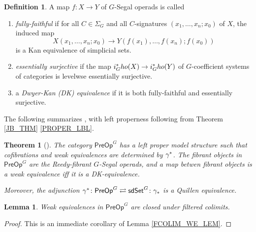 \documentclass[a4paper,10pt
,draft
]{article}%
\numberwithin{equation}{section}
\numberwithin{figure}{section}
\newtheorem{theorem}[equation]{Theorem}%
\newtheorem{lemma}[equation]{Lemma}%
\theoremstyle{definition} %
\newtheorem{definition}[equation]{Definition}%
\newcommand{\1}{\ensuremath{\mathbbm 1}}%
\begin{document}
\begin{definition}
      A map $f \colon X \to Y$ of $G$-Segal operads is called
      \begin{enumerate}[label = (\roman*)]
      \item \textit{fully-faithful} if for all $C \in \Sigma_G$ and all $C$-signatures $(x_1,\dots, x_n;x_0)$ of $X$, the induced map
            \[
                  X(x_1, \dots, x_n; x_0) \to Y(f(x_1), \dots, f(x_n); f(x_0))
            \]
            is a Kan equivalence of simplicial sets.
      \item \textit{essentially surjective} if the map 
      $i_G^{\**}ho(X) \to i_G^{\**}ho(Y)$ of $G$-coefficient systems of categories
            is levelwse essentially surjective.
      \item a \textit{Dwyer-Kan (DK) equivalence} if it is both fully-faithful and essentially surjective.
      \end{enumerate}
\end{definition}

The following summarizes \cite[Theorems 4.39, 4.42, and 5.48, and Corollary 5.51]{BP_edss},
with left properness following from Theorem \ref{JB_THM} \ref{PROPER_LBL}.
\begin{theorem}[\cite{BP_edss}]
      The category $\mathsf{PreOp}^G$ has a left proper model structure such that
      cofibrations and weak equivalences are determined by $\gamma^{\**}$.
      The fibrant objects in $\mathsf{PreOp}^G$ are the Reedy-fibrant $G$-Segal operads,
      and a map betwen fibrant objects is a weak equivalence iff it is a DK-equivalence.
      
      Moreover, the adjunction $\gamma^{\**} \colon \mathsf{PreOp}^G \rightleftarrows \mathsf{sdSet}^G \colon \gamma_{\**}$
      is a Quillen equivalence.
\end{theorem}

\begin{lemma}
      \label{FCOLIM_WE2_LEM}
      Weak equivalences in $\mathsf{PreOp}^G$ are closed under filtered colimits.
\end{lemma}
\begin{proof}
      This is an immediate corollary of Lemma \ref{FCOLIM_WE_LEM}.
\end{proof}
\end{document}

